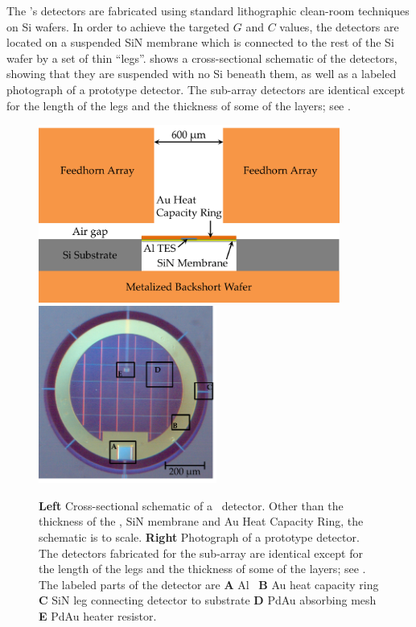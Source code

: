 The \Imager's detectors are fabricated using standard lithographic clean-room techniques on Si wafers.
In order to achieve the targeted $G$ and $C$ values, the detectors are located on a suspended SiN membrane which is connected to the rest of the Si wafer by a set of thin ``legs''.
 shows a cross-sectional schematic of the detectors, showing that they are suspended with no Si beneath them, as well as a labeled photograph of a prototype detector.
The sub-array detectors are identical except for the length of the legs and the thickness of some of the layers; see .

\begin{figure}
\centering
\includegraphics[width=3.9in]{images/ch5-det-schematic.png}
\includegraphics[width=2.3in]{images/ch5-proto-pixel-labeled.png}
\caption[Detector cross-section and photograph]{
  \textbf{Left} Cross-sectional schematic of a \Imager\ detector.
  Other than the thickness of the \TES, SiN membrane and Au Heat Capacity Ring, the schematic is to scale.
  \textbf{Right} Photograph of a prototype detector.
  The detectors fabricated for the sub-array are identical except for the length of the legs and the thickness of some of the layers; see .
  The labeled parts of the detector are \textbf{A} Al \TES\ \textbf{B} Au heat capacity ring \textbf{C} SiN leg connecting detector to substrate \textbf{D} PdAu absorbing mesh \textbf{E} PdAu heater resistor.
}
\label{fig:ch5-det-layout}
\end{figure}

